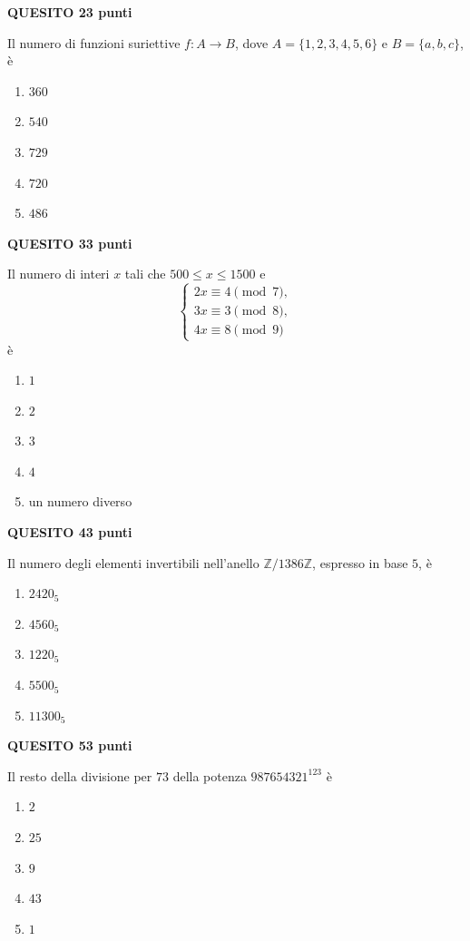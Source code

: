 \documentclass[11pt,a4paper]{article}
\newcommand{\quesito}[2]{%
    \par\addvspace{0.55em}%
    \noindent\colorbox{examPale}{%
        \parbox{\dimexpr\linewidth-2\fboxsep\relax}{%
            \color{examNavy}\textbf{QUESITO #1}\hfill\textbf{#2 punti}}}%
    \par\nobreak\vspace{0.15em}%
}
\begin{document}
\begin{samepage}
\quesito{2}{3}
Il numero di funzioni suriettive $f:A\to B$, dove
$A=\{1,2,3,4,5,6\}$ e $B=\{a,b,c\}$, \`e
\begin{enumerate}
    \item $360$
    \item $540$
    \item $729$
    \item $720$
    \item $486$
\end{enumerate}
\end{samepage}

\begin{samepage}
\quesito{3}{3}
Il numero di interi $x$ tali che $500\leq x\leq1500$ e
\[
    \begin{cases}
        2x\equiv4\pmod 7,\\
        3x\equiv3\pmod 8,\\
        4x\equiv8\pmod 9
    \end{cases}
\]
\`e
\begin{enumerate}
    \item $1$
    \item $2$
    \item $3$
    \item $4$
    \item un numero diverso
\end{enumerate}
\end{samepage}

\begin{samepage}
\quesito{4}{3}
Il numero degli elementi invertibili nell'anello $\mathbb{Z}/1386\mathbb{Z}$,
espresso in base $5$, \`e
\begin{enumerate}
    \item $2420_5$
    \item $4560_5$
    \item $1220_5$
    \item $5500_5$
    \item $11300_5$
\end{enumerate}
\end{samepage}

\begin{samepage}
\quesito{5}{3}
Il resto della divisione per $73$ della potenza
$987654321^{123}$ \`e
\begin{enumerate}
    \item $2$
    \item $25$
    \item $9$
    \item $43$
    \item $1$
\end{enumerate}
\end{samepage}
\end{document}

